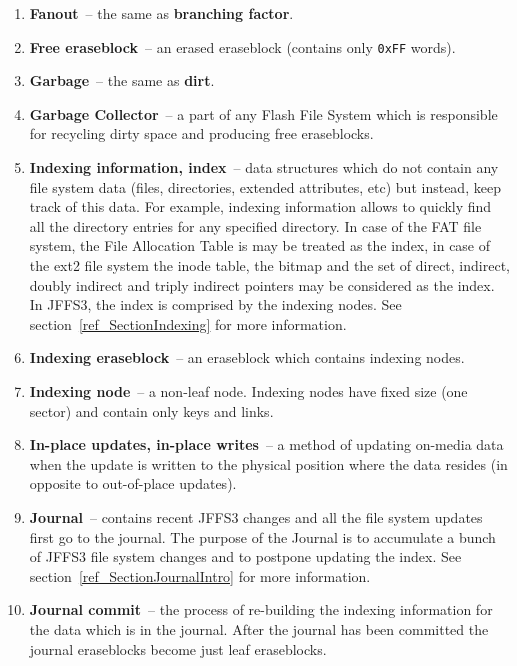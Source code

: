 \begin{enumerate}
\item \textbf{Fanout}~-- the same as \textbf{branching factor}.

\item \textbf{Free eraseblock}~-- an erased eraseblock (contains only
\texttt{0xFF} words).

\item \textbf{Garbage}~-- the same as \textbf{dirt}.

\item \textbf{Garbage Collector}~-- a part of any Flash File System which
is responsible for recycling dirty space and producing free eraseblocks.

\item \textbf{Indexing information, index}~-- data structures which do not
contain any file system data (files, directories, extended attributes, etc) but
instead, keep track of this data. For example, indexing information allows to
quickly find all the directory entries for any specified directory. In case of
the FAT file system, the File Allocation Table is may be treated as the index,
in case of the ext2 file system the inode table, the bitmap and the set of
direct, indirect, doubly indirect and triply indirect pointers may be
considered as the index. In JFFS3, the index is comprised by the indexing
nodes. See section~\ref{ref_SectionIndexing} for more information.

\item \textbf{Indexing eraseblock}~-- an eraseblock which contains indexing
nodes.

\item \textbf{Indexing node}~-- a \mbox{non-leaf} node. Indexing nodes have
fixed size (one sector) and contain only keys and links.

\item \textbf{In-place updates, in-place writes}~-- a method of updating
\mbox{on-media} data when the update is written to the physical position where
the data resides (in opposite to \mbox{out-of-place} updates).

\item \textbf{Journal}~-- contains recent JFFS3 changes and all the file system
updates first go to the journal. The purpose of the Journal is to accumulate a
bunch of JFFS3 file system changes and to postpone updating the index. See
section~\ref{ref_SectionJournalIntro} for more information.

\item \textbf{Journal commit}~-- the process of \mbox{re-building} the indexing
information for the data which is in the journal. After the journal has been
committed the journal eraseblocks become just leaf eraseblocks.


\end{enumerate}
